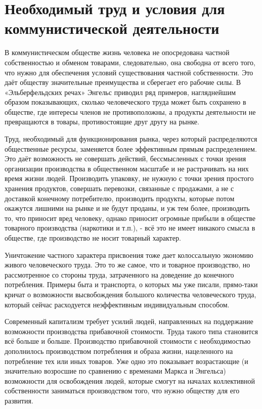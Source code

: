 \documentclass[12pt,a4paper,openany]{book}
\begin{document}
\section{Необходимый труд и условия для коммунистической деятельности}
\label{sec:06_necessitatem_truda}

В коммунистическом обществе жизнь человека не опосредована частной собственностью и обменом товарами, следовательно, она свободна от всего того, что нужно для обеспечения условий существования частной собственности. Это даёт обществу значительные преимущества и сберегает его рабочие силы. В «Эльберфельдских речах» Энгельс приводил ряд примеров, нагляднейшим образом показывающих, сколько человеческого труда может быть сохранено в обществе, где интересы членов не противоположны, а продукты деятельности не превращаются в товары, противостоящие друг другу на рынке.

Труд, необходимый для функционирования рынка, через который распределяются общественные ресурсы, заменяется более эффективным прямым распределением. Это даёт возможность не совершать действий, бессмысленных с точки зрения организации производства в общественном масштабе и не растрачивать на них время жизни людей. Производить упаковку, не нужную с точки зрения простого хранения продуктов, совершать перевозки, связанные с продажами, а не с доставкой конечному потребителю, производить продукты, которые потом окажутся лишними на рынке и не будут проданы, и уж тем более, производить то, что приносит вред человеку, однако приносит огромные прибыли в обществе товарного производства (наркотики и т.п.), - всё это не имеет никакого смысла в обществе, где производство не носит товарный характер.

Уничтожение частного характера присвоения тоже дает колоссальную экономию живого человеческого труда. Это то же самое, что и товарное производство, но рассмотренное со стороны труда, затраченного на доведение до конечного потребления. Примеры быта и транспорта, о которых мы уже писали, прямо-таки кричат о возможности высвобождения большого количества человеческого труда, который сейчас расходуется неэффективным индивидуальным способом.

Современный капитализм требует усилий людей, направленных на поддержание возможности производства прибавочной стоимости. Труда такого типа становится всё больше и больше. Производство прибавочной стоимости с необходимостью дополнилось производством потребления и образа жизни, нацеленного на потребление тех или иных товаров. Уже одно это показывает возрастающие (и значительно возросшие по сравнению с временами Маркса и Энгельса) возможности для освобождения людей, которые смогут на началах коллективной собственности заниматься производством того, что нужно обществу для его развития.
\end{document}
